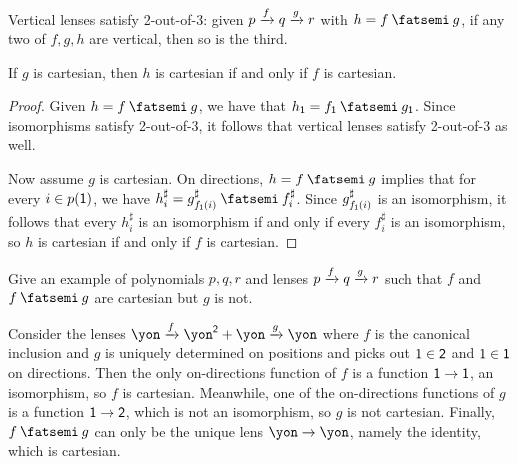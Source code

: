 \documentclass[Book-Poly]{subfiles}
\begin{document}
\begin{proposition}
Vertical lenses satisfy 2-out-of-3: given $p\xrightarrow{f}q\xrightarrow{g}r$ with $h = f \then g$, if any two of $f,g,h$ are vertical, then so is the third.

If $g$ is cartesian, then $h$ is cartesian if and only if $f$ is cartesian.
\end{proposition}
\begin{proof}
Given $h = f \then g$, we have that $h_\1 = f_\1 \then g_\1$.
Since isomorphisms satisfy 2-out-of-3, it follows that vertical lenses satisfy 2-out-of-3 as well.

Now assume $g$ is cartesian.
On directions, $h = f \then g$ implies that for every $i \in p(\textsf{1})$, we have $h^\sharp_i = g^\sharp_{f_\1(i)} \then f^\sharp_i$.
Since $g^\sharp_{f_{\textsf{1}}(i)}$ is an isomorphism, it follows that every $h^\sharp_i$ is an isomorphism if and only if every $f^\sharp_i$ is an isomorphism, so $h$ is cartesian if and only if $f$ is cartesian.
\end{proof}

\begin{exercise}
Give an example of polynomials $p,q,r$ and lenses $p\xrightarrow{f}q\xrightarrow{g}r$ such that $f$ and $f \then g$ are cartesian but $g$ is not.
\begin{solution}
Consider the lenses $\yon \To{f} \yon^\2 + \yon \To{g} \yon$ where $f$ is the canonical inclusion and $g$ is uniquely determined on positions and picks out $1 \in \textsf{2}$ and $1 \in \textsf{1}$ on directions.
Then the only on-directions function of $f$ is a function $\textsf{1} \to \textsf{1}$, an isomorphism, so $f$ is cartesian.
Meanwhile, one of the on-directions functions of $g$ is a function $\textsf{1} \to \textsf{2}$, which is not an isomorphism, so $g$ is not cartesian.
Finally, $f \then g$ can only be the unique lens $\yon \to \yon$, namely the identity, which is cartesian.
\end{solution}
\end{exercise}
\end{document}
